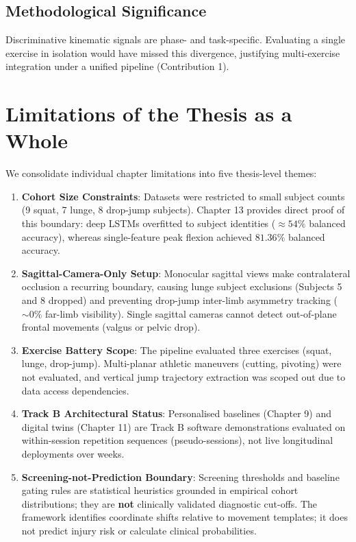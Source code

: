 \subsection{Methodological Significance}
\label{sec:14-3-3-methodological-significance}

Discriminative kinematic signals are phase- and task-specific. Evaluating a single exercise in isolation would have missed this divergence, justifying multi-exercise integration under a unified pipeline (Contribution 1).



\section{Limitations of the Thesis as a Whole}
\label{sec:14-4-limitations-of-the-thesis-as-a-whole}


We consolidate individual chapter limitations into five thesis-level themes:

\begin{enumerate}
  \item \textbf{Cohort Size Constraints}: Datasets were restricted to small subject counts (9 squat, 7 lunge, 8 drop-jump subjects). Chapter 13 provides direct proof of this boundary: deep LSTMs overfitted to subject identities ($\approx 54\%$ balanced accuracy), whereas single-feature peak flexion achieved $81.36\%$ balanced accuracy.
  \item \textbf{Sagittal-Camera-Only Setup}: Monocular sagittal views make contralateral occlusion a recurring boundary, causing lunge subject exclusions (Subjects 5 and 8 dropped) and preventing drop-jump inter-limb asymmetry tracking ($\sim 0\%$ far-limb visibility). Single sagittal cameras cannot detect out-of-plane frontal movements (valgus or pelvic drop).
  \item \textbf{Exercise Battery Scope}: The pipeline evaluated three exercises (squat, lunge, drop-jump). Multi-planar athletic maneuvers (cutting, pivoting) were not evaluated, and vertical jump trajectory extraction was scoped out due to data access dependencies.
  \item \textbf{Track B Architectural Status}: Personalised baselines (Chapter 9) and digital twins (Chapter 11) are Track B software demonstrations evaluated on within-session repetition sequences (pseudo-sessions), not live longitudinal deployments over weeks.
  \item \textbf{Screening-not-Prediction Boundary}: Screening thresholds and baseline gating rules are statistical heuristics grounded in empirical cohort distributions; they are \textbf{not} clinically validated diagnostic cut-offs. The framework identifies coordinate shifts relative to movement templates; it does not predict injury risk or calculate clinical probabilities.
\end{enumerate}



